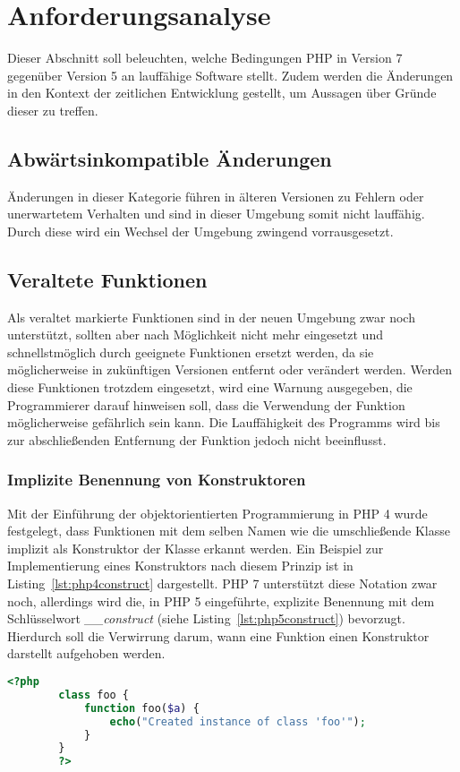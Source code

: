 \chapter{Anforderungsanalyse}\label{ch:php7}
Dieser Abschnitt soll beleuchten, welche Bedingungen PHP in Version 7 gegenüber Version 5 an lauffähige Software stellt. Zudem werden die Änderungen in den Kontext der
zeitlichen Entwicklung gestellt, um Aussagen über Gründe dieser zu treffen.

\section{Abwärtsinkompatible Änderungen}
Änderungen in dieser Kategorie führen in älteren Versionen zu Fehlern oder unerwartetem Verhalten und sind in dieser Umgebung somit nicht lauffähig. Durch diese wird ein 
Wechsel der Umgebung zwingend vorrausgesetzt.

\section{Veraltete Funktionen}
Als veraltet markierte Funktionen sind in der neuen Umgebung zwar noch unterstützt, sollten aber nach Möglichkeit nicht mehr eingesetzt und schnellstmöglich durch geeignete 
Funktionen ersetzt werden, da sie möglicherweise in zukünftigen Versionen entfernt oder verändert werden. Werden diese Funktionen trotzdem eingesetzt, wird eine Warnung 
ausgegeben, die Programmierer darauf hinweisen soll, dass die Verwendung der Funktion möglicherweise gefährlich sein kann. Die Lauffähigkeit des Programms wird bis zur 
abschließenden Entfernung der Funktion jedoch nicht beeinflusst. \cite{oracle_how_2004}
    \subsection{Implizite Benennung von Konstruktoren}
    Mit der Einführung der objektorientierten Programmierung in PHP 4 wurde festgelegt, dass Funktionen mit dem selben Namen wie die umschließende Klasse implizit als 
    Konstruktor der Klasse erkannt werden. Ein Beispiel zur Implementierung eines Konstruktors nach diesem Prinzip ist in Listing~\ref{lst:php4construct} dargestellt.
    PHP 7 unterstützt diese Notation zwar noch, allerdings wird die, in PHP 5 eingeführte, explizite Benennung mit dem Schlüsselwort \textit{\_\_construct} (siehe 
    Listing~\ref{lst:php5construct}) bevorzugt. Hierdurch soll die Verwirrung darum, wann eine Funktion einen Konstruktor darstellt aufgehoben werden. \cite{levi_php:_2014}
    \begin{lstlisting}[language=php, caption={Beispiel eines impliziten Konstruktors}, label={lst:php4construct}]
        <?php
        class foo {
            function foo($a) {
                echo("Created instance of class 'foo'");
            }
        }
        ?>
    \end{lstlisting}

